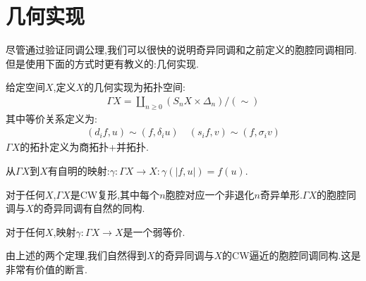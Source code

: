 \section{几何实现}
尽管通过验证同调公理,我们可以很快的说明奇异同调和之前定义的胞腔同调相同.但是使用下面的方式时更有教义的:几何实现.
\begin{definition}
    给定空间$X$,定义$X$的几何实现为拓扑空间:
    \begin{align*}
        \Gamma X=\coprod_{n \geq 0}(S_n X \times \Delta_n)/(\sim) 
    \end{align*}
    其中等价关系定义为:
    \begin{align*}
        (d_if,u)\sim (f,\delta_i u) \quad (s_if,v)\sim (f,\sigma_i v)
    \end{align*}
    $\Gamma X$的拓扑定义为商拓扑+并拓扑.
\end{definition}
从$\Gamma X$到$X$有自明的映射:$\gamma:\Gamma X \to X:\gamma(|f,u|)=f(u)$.
\begin{theorem}\label{thm:iso}
    对于任何$X$,$\Gamma X$是CW复形,其中每个$n$胞腔对应一个非退化$n$奇异单形.$\Gamma X$的胞腔同调与$X$的奇异同调有自然的同构.
\end{theorem}
\begin{theorem}\label{thm:weake}
    对于任何$X$,映射$\gamma:\Gamma X \to X$是一个弱等价.
\end{theorem}
由上述的两个定理,我们自然得到$X$的奇异同调与$X$的CW逼近的胞腔同调同构.这是非常有价值的断言.
